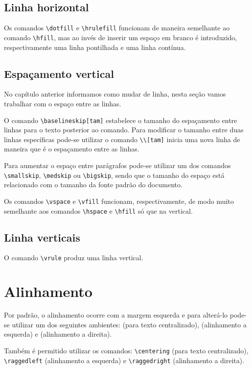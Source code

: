 \subsection{Linha horizontal}
Os comandos \lstinline!\dotfill! e \lstinline!\hrulefill! funcionam de maneira semelhante ao comando \lstinline!\hfill!, mas ao invés de inserir um espaço em branco é introduzido, respectivamente uma linha pontilhada e uma linha contínua.

\subsection{Espaçamento vertical}
No capítulo anterior informamos como mudar de linha, nesta seção vamos trabalhar com o espaço entre as linhas.

O comando \lstinline!\baselineskip[tam]! estabelece o tamanho do espaçamento entre linhas para o texto posterior ao comando. Para modificar o tamanho entre duas linhas específicas pode-se utilizar o comando \lstinline!\\[tam]! inicia uma nova linha de maneira que  é o espaçamento entre as linhas.

Para aumentar o espaço entre parágrafos pode-se utilizar um dos comandos \lstinline!\smallskip!, \lstinline!\medskip! ou \lstinline!\bigskip!, sendo que o tamanho do espaço está relacionado com o tamanho da fonte padrão do documento.

Os comandos \lstinline!\vspace! e \lstinline!\vfill! funcionam, respectivamente, de modo muito semelhante aos comandos \lstinline!\hspace! e \lstinline!\hfill! só que na vertical.

\subsection{Linha verticais}
O comando \lstinline!\vrule! produz uma linha vertical.

\section{Alinhamento}
Por padrão, o alinhamento ocorre com a margem esquerda e para alterá-lo pode-se utilizar um dos seguintes ambientes:  (para texto centralizado),  (alinhamento a esquerda) e  (alinhamento a direita). \\

Também é permitido utilizar os comandos: \lstinline!\centering! (para texto centralizado), \lstinline!\raggedleft! (alinhamento a esquerda) e \lstinline!\raggedright! (alinhamento a direita).
